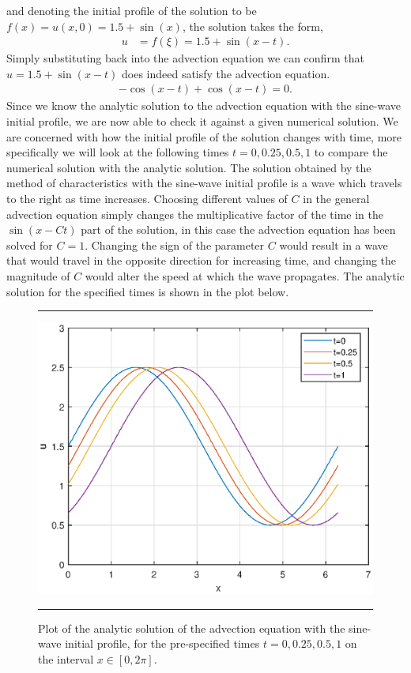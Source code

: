 \documentclass[a4paper, 12pt]{article}
\begin{document}
and denoting the initial profile of the solution to be $f(x) = u(x,0) = 1.5 + \sin(x)$, the solution takes the form,
\begin{align*}
u &= f(\xi) = 1.5 + \sin(x-t).
\end{align*}
Simply substituting back into the advection equation we can confirm that $u = 1.5 + \sin(x-t)$ does indeed satisfy the advection equation.  
\begin{align*}
-\cos(x-t) + \cos(x-t) = 0. 
\end{align*}  
Since we know the analytic solution to the advection equation with the sine-wave initial profile, we are now able to check it against a given numerical solution. We are concerned with how the initial profile of the solution changes with time, more specifically we will look at the following times $t=0,0.25,0.5,1$ to compare the numerical solution with the analytic solution. The solution obtained by the method of characteristics with the sine-wave initial profile is a wave which travels to the right as time increases. Choosing different values of $C$ in the general advection equation simply changes the multiplicative factor of the time in the $\sin(x-Ct)$ part of the solution, in this case the advection equation has been solved for $C=1$. Changing the sign of the parameter $C$ would result in a wave that would travel in the opposite direction for increasing time, and changing the magnitude of $C$ would alter the speed at which the wave propagates. The analytic solution for the specified times is shown in the plot below. 
\begin{figure}[H]
\centering
\rule{\linewidth}{.4pt}
\includegraphics[scale=0.75]{Q1_exactsolution}
\caption{Plot of the analytic solution of the advection equation with the sine-wave initial profile, for the pre-specified times $t=0,0.25,0.5,1$ on the interval $x\in[0,2\pi]$.}
\rule{\linewidth}{.4pt}
\end{figure}
\end{document}
